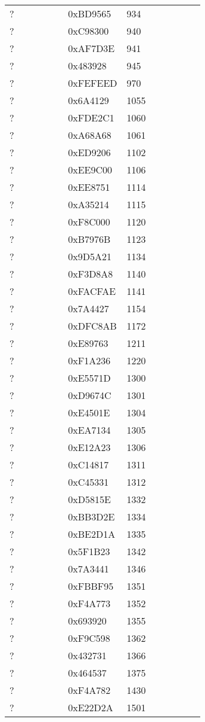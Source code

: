 \begin{longtable}{p{0.3\linewidth} p{0.3\linewidth} p{0.4\linewidth}}
? &  0xBD9565 &  934\\
? &  0xC98300 &  940\\
? &  0xAF7D3E &  941\\
? &  0x483928 &  945\\
? &  0xFEFEED &  970\\
? &  0x6A4129 &  1055\\
? &  0xFDE2C1 &  1060\\
? &  0xA68A68 &  1061\\
? &  0xED9206 &  1102\\
? &  0xEE9C00 &  1106\\
? &  0xEE8751 &  1114\\
? &  0xA35214 &  1115\\
? &  0xF8C000 &  1120\\
? &  0xB7976B &  1123\\
? &  0x9D5A21 &  1134\\
? &  0xF3D8A8 &  1140\\
? &  0xFACFAE &  1141\\
? &  0x7A4427 &  1154\\
? &  0xDFC8AB &  1172\\
? &  0xE89763 &  1211\\
? &  0xF1A236 &  1220\\
? &  0xE5571D &  1300\\
? &  0xD9674C &  1301\\
? &  0xE4501E &  1304\\
? &  0xEA7134 &  1305\\
? &  0xE12A23 &  1306\\
? &  0xC14817 &  1311\\
? &  0xC45331 &  1312\\
? &  0xD5815E &  1332\\
? &  0xBB3D2E &  1334\\
? &  0xBE2D1A &  1335\\
? &  0x5F1B23 &  1342\\
? &  0x7A3441 &  1346\\
? &  0xFBBF95 &  1351\\
? &  0xF4A773 &  1352\\
? &  0x693920 &  1355\\
? &  0xF9C598 &  1362\\
? &  0x432731 &  1366\\
? &  0x464537 &  1375\\
? &  0xF4A782 &  1430\\
? &  0xE22D2A &  1501\\

\end{longtable}
